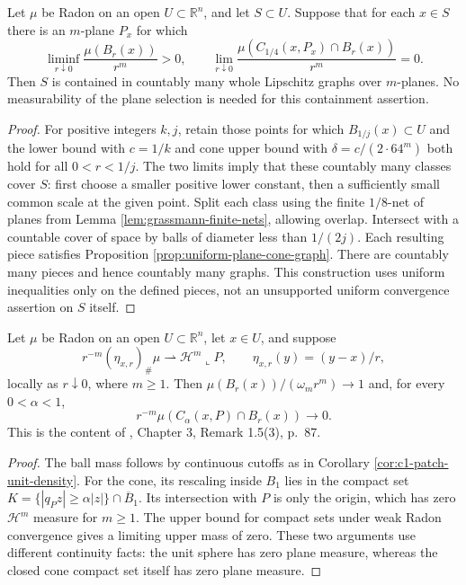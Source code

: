 \begin{theorem}\label{thm:pointwise-plane-cone-cover}
Let $\mu$ be Radon on an open $U\subset\mathbb R^n$, and let $S\subset U$. Suppose that for each $x\in S$ there is an $m$-plane $P_x$ for which
\[
 \liminf_{r\downarrow0}\frac{\mu(B_r(x))}{r^m}>0,\qquad
 \lim_{r\downarrow0}\frac{\mu(C_{1/4}(x,P_x)\cap B_r(x))}{r^m}=0.
\]
Then $S$ is contained in countably many whole Lipschitz graphs over $m$-planes. No measurability of the plane selection is needed for this containment assertion.
\end{theorem}
\begin{proof}
For positive integers $k,j$, retain those points for which $B_{1/j}(x)\subset U$ and the lower bound with $c=1/k$ and cone upper bound with $\delta=c/(2\cdot64^m)$ both hold for all $0<r<1/j$. The two limits imply that these countably many classes cover $S$: first choose a smaller positive lower constant, then a sufficiently small common scale at the given point. Split each class using the finite $1/8$-net of planes from Lemma \ref{lem:grassmann-finite-nets}, allowing overlap. Intersect with a countable cover of space by balls of diameter less than $1/(2j)$. Each resulting piece satisfies Proposition \ref{prop:uniform-plane-cone-graph}. There are countably many pieces and hence countably many graphs. This construction uses uniform inequalities only on the defined pieces, not an unsupported uniform convergence assertion on $S$ itself.
\end{proof}

\begin{lemma}\label{lem:plane-tangent-density-cone}
Let $\mu$ be Radon on an open $U\subset\mathbb R^n$, let $x\in U$, and suppose
\[
 r^{-m}(\eta_{x,r})_\#\mu\rightharpoonup\mathcal H^m\llcorner P,
 \qquad \eta_{x,r}(y)=(y-x)/r,
\]
locally as $r\downarrow0$, where $m\geq1$. Then $\mu(B_r(x))/(\omega_mr^m)\to1$ and, for every $0<\alpha<1$,
\[
 r^{-m}\mu(C_\alpha(x,P)\cap B_r(x))\to0.
\]
This is the content of \cite{Sim18}, Chapter 3, Remark 1.5(3), p.~87.
\end{lemma}
\begin{proof}
The ball mass follows by continuous cutoffs as in Corollary \ref{cor:c1-patch-unit-density}. For the cone, its rescaling inside $B_1$ lies in the compact set $K=\{|q_Pz|\geq\alpha|z|\}\cap\overline B_1$. Its intersection with $P$ is only the origin, which has zero $\mathcal H^m$ measure for $m\geq1$. The upper bound for compact sets under weak Radon convergence gives a limiting upper mass of zero. These two arguments use different continuity facts: the unit sphere has zero plane measure, whereas the closed cone compact set itself has zero plane measure.
\end{proof}

